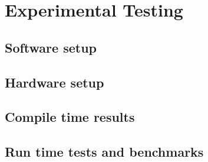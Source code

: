 \chapter{Experimental Testing}

\section{Software setup}
\section{Hardware setup}
\section{Compile time results}
\section{Run time tests and benchmarks}